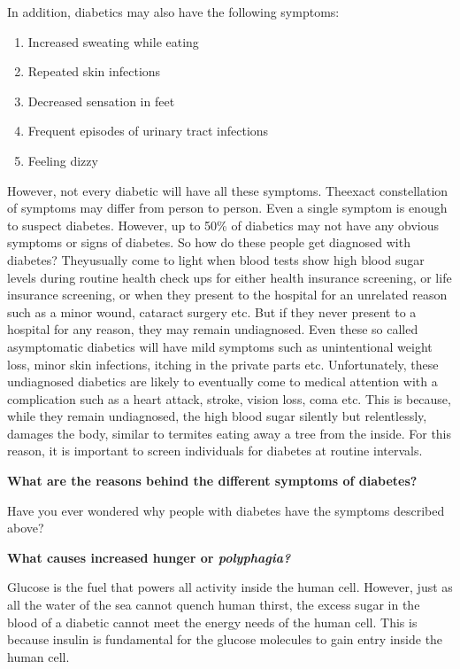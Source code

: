 In addition, diabetics may also have the following symptoms:

\begin{enumerate}[\ding{226}]
\itemsep=0pt
\item Increased sweating while eating
\item Repeated skin infections
\item Decreased sensation in feet
\item Frequent episodes of urinary tract infections
\item Feeling dizzy
 \end{enumerate}

However, not every diabetic will have all these symptoms. The\break exact constellation of symptoms may differ from person to person. Even a single symptom is enough to suspect diabetes. However, up to 50\% of diabetics may not have any obvious symptoms or signs of diabetes. So how do these people get diagnosed with diabetes? They\break usually come to light when blood tests show high blood sugar levels during routine health check ups for either health insurance scree\-ning, or life insurance screening, or when they present to the hospital for an un\-related reason such as a minor wound, cataract surgery etc. But if they never present to a hospital for any reason, they may remain undia\-gnosed. Even these so called asymptomatic diabetics will have mild symptoms such as unintentional weight loss, minor skin infections, itching in the private parts etc. Unfortunately, these undiagno\-sed dia\-betics are likely to eventually come to medical attention with a compli\-cation such as a heart attack, stroke, vision loss, coma etc. This is because, while they remain undiagnosed, the high blood sugar silently but relentlessly, damages the body, similar to termites eating away a tree from the inside. For this reason, it is important to screen indi\-viduals for diabetes at routine intervals.

\noindent
\textbf{What are the reasons behind the different symptoms of diabetes?}

Have you ever wondered why people with diabetes have the symptoms described above?

\noindent
\textbf{What causes increased hunger or \textit{polyphagia?}}

Glucose is the fuel that powers all activity inside the human cell. However, just as all the water of the sea cannot quench human thirst, the excess sugar in the blood of a diabetic cannot meet the energy needs of the human cell. This is because insulin is fundamental for the glucose molecules to gain entry inside the human cell.

